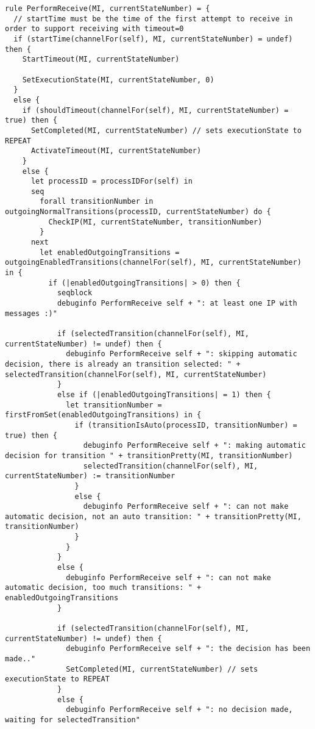 \begin{listing}[H]
\begin{verbatim}
rule PerformReceive(MI, currentStateNumber) = {
  // startTime must be the time of the first attempt to receive in order to support receiving with timeout=0
  if (startTime(channelFor(self), MI, currentStateNumber) = undef) then {
    StartTimeout(MI, currentStateNumber)

    SetExecutionState(MI, currentStateNumber, 0)
  }
  else {
    if (shouldTimeout(channelFor(self), MI, currentStateNumber) = true) then {
      SetCompleted(MI, currentStateNumber) // sets executionState to REPEAT
      ActivateTimeout(MI, currentStateNumber)
    }
    else {
      let processID = processIDFor(self) in
      seq
        forall transitionNumber in outgoingNormalTransitions(processID, currentStateNumber) do {
          CheckIP(MI, currentStateNumber, transitionNumber)
        }
      next
        let enabledOutgoingTransitions = outgoingEnabledTransitions(channelFor(self), MI, currentStateNumber) in {
          if (|enabledOutgoingTransitions| > 0) then {
            seqblock
            debuginfo PerformReceive self + ": at least one IP with messages :)"

            if (selectedTransition(channelFor(self), MI, currentStateNumber) != undef) then {
              debuginfo PerformReceive self + ": skipping automatic decision, there is already an transition selected: " + selectedTransition(channelFor(self), MI, currentStateNumber)
            }
            else if (|enabledOutgoingTransitions| = 1) then {
              let transitionNumber = firstFromSet(enabledOutgoingTransitions) in {
                if (transitionIsAuto(processID, transitionNumber) = true) then {
                  debuginfo PerformReceive self + ": making automatic decision for transition " + transitionPretty(MI, transitionNumber)
                  selectedTransition(channelFor(self), MI, currentStateNumber) := transitionNumber
                }
                else {
                  debuginfo PerformReceive self + ": can not make automatic decision, not an auto transition: " + transitionPretty(MI, transitionNumber)
                }
              }
            }
            else {
              debuginfo PerformReceive self + ": can not make automatic decision, too much transitions: " + enabledOutgoingTransitions
            }

            if (selectedTransition(channelFor(self), MI, currentStateNumber) != undef) then {
              debuginfo PerformReceive self + ": the decision has been made.."
              SetCompleted(MI, currentStateNumber) // sets executionState to REPEAT
            }
            else {
              debuginfo PerformReceive self + ": no decision made, waiting for selectedTransition"


\end{verbatim}
\end{listing}
